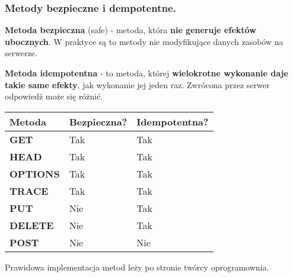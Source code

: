 \documentclass[../main.tex]{subfiles}
\begin{document}
    \subsubsection{Metody bezpieczne i dempotentne.}

    \begin{theorem}
        \textbf{Metoda bezpieczna} (safe) - metoda, która \textbf{nie generuje efektów ubocznych}. W praktyce są to metody nie modyfikujące danych zasobów na serwerze.
    \end{theorem}

    \begin{theorem}
        \textbf{Metoda idempotentna} - to metoda, której \textbf{wielokrotne wykonanie daje takie same efekty}, jak wykonanie jej jeden raz. Zwrócona przez serwer odpowiedź może się różnić.
    \end{theorem}

    \begin{table}[H]
        \begin{center}
            \begin{tabular}{|p{5cm}|p{5cm}|p{5cm}|}
                \hline
                \textbf{Metoda} & \textbf{Bezpieczna?} & \textbf{Idempotentna?}\\
                \hline
                \hline
                \textbf{GET} & Tak & Tak \\
                \hline
                \textbf{HEAD} & Tak & Tak \\
                \hline
                \textbf{OPTIONS} & Tak & Tak \\
                \hline
                \textbf{TRACE} & Tak & Tak \\
                \hline
                \textbf{PUT} & Nie & Tak \\
                \hline
                \textbf{DELETE} & Nie & Tak \\
                \hline
                \textbf{POST} & Nie & Nie \\
                \hline
            \end{tabular}
        \end{center}
    \end{table}
    Prawidowa implementacja metod leży po stronie twórcy oprogramownia.
\end{document}
